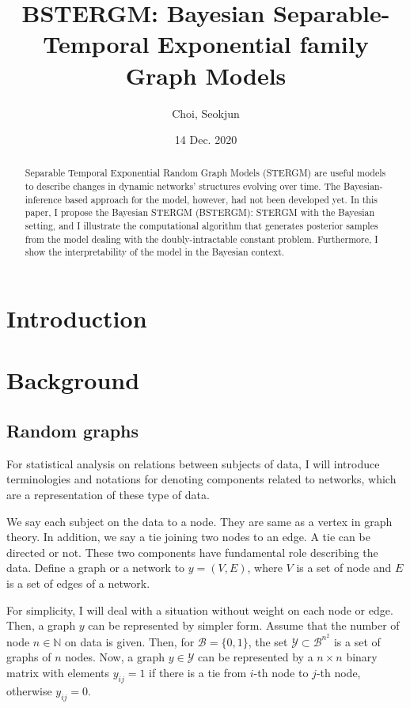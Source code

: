 \documentclass[aspectratio=169,ignorenonframetext,9pt]{beamer}
\title{BSTERGM: Bayesian Separable-Temporal Exponential family Graph Models}
\author{Choi, Seokjun}
\date{14 Dec. 2020}
\theoremstyle{plain}
\theoremstyle{definition}
\begin{document}
\begin{frame}
\maketitle
\end{frame}


\begin{abstract}
Separable Temporal Exponential Random Graph Models (STERGM) are useful models to describe changes in dynamic networks' structures evolving over time. 
The Bayesian-inference based approach for the model, however, had not been developed yet. 
In this paper, I propose the Bayesian STERGM (BSTERGM): STERGM with the Bayesian setting, and I illustrate the computational algorithm that generates posterior samples from the model dealing with the doubly-intractable constant problem. 
Furthermore, I show the interpretability of the model in the Bayesian context.

\end{abstract}



\section{Introduction}


\section{Background}
\subsection{Random graphs}
For statistical analysis on relations between subjects of data,
I will introduce terminologies and notations for denoting components related to networks, 
which are a representation of these type of data.

We say each subject on the data to a node. They are same as a vertex in graph theory.
In addition, we say a tie joining two nodes to an edge. A tie can be directed or not.
These two components have fundamental role describing the data.
Define a graph or a network to $y=(V,E)$, where $V$ is a set of node and $E$ is a set of edges of a network.

For simplicity, I will deal with a situation without weight on each node or edge.
Then, a graph $y$ can be represented by simpler form.
Assume that the number of node $n\in \mathbb{N}$ on data is given.
Then, for $\mathcal{B}=\{0,1\}$,
the set $\mathcal{Y} \subset \mathcal{B}^{n^2}$ is a set of graphs of $n$ nodes.
Now, a graph $y \in \mathcal{Y}$ can be represented by a $n \times n$ binary matrix
with elements $y_{ij}=1$ if there is a tie from $i$-th node to $j$-th node,
otherwise $y_{ij}=0$.
\end{document}
